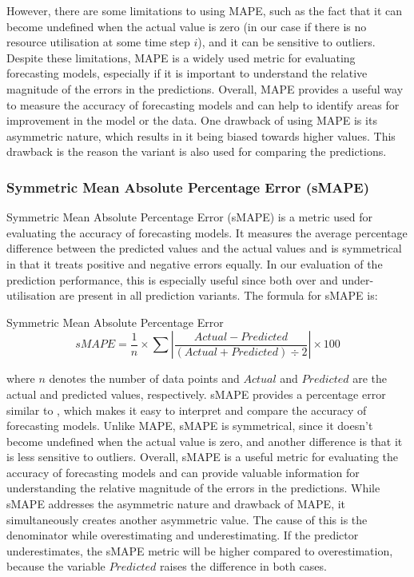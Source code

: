       However, there are some limitations to using MAPE, such as the fact that it can become undefined when the actual value is zero (in our case if there is no resource utilisation at some time step $i$), and it can be sensitive to outliers.
      Despite these limitations, MAPE is a widely used metric for evaluating forecasting models, especially if it is important to understand the relative magnitude of the errors in the predictions. 
      Overall, MAPE provides a useful way to measure the accuracy of forecasting models and can help to identify areas for improvement in the model or the data.
      One drawback of using MAPE is its asymmetric nature, which results in it being biased towards higher values.
      This drawback is the reason the variant  is also used for comparing the predictions.


    \subsubsection{Symmetric Mean Absolute Percentage Error (sMAPE)}
    \label{sec:smape-metrics-evaluation}
    
      Symmetric Mean Absolute Percentage Error (sMAPE) \cite{kreinovichHowEstimateForecasting2014} is a metric used for evaluating the accuracy of forecasting models. It measures the average percentage difference between the predicted values and the actual values and is symmetrical in that it treats positive and negative errors equally.
      In our evaluation of the prediction performance, this is especially useful since both over and under-utilisation are present in all prediction variants.
      The formula for sMAPE is:

      \begin{pabox}{Symmetric Mean Absolute Percentage Error}
        $$sMAPE = \frac{1}{n} \times \sum \left|\frac{Actual - Predicted}{\left(Actual + Predicted\right) \div 2}\right| \times 100$$
      \end{pabox}
      where $n$ denotes the number of data points and $Actual$ and $Predicted$ are the actual and predicted values, respectively.
      sMAPE provides a percentage error similar to , which makes it easy to interpret and compare the accuracy of forecasting models. Unlike MAPE, sMAPE is symmetrical, since it doesn't become undefined when the actual value is zero, and another difference is that it is less sensitive to outliers.
      Overall, sMAPE is a useful metric for evaluating the accuracy of forecasting models and can provide valuable information for understanding the relative magnitude of the errors in the predictions.
      While sMAPE addresses the asymmetric nature and drawback of MAPE, it simultaneously creates another asymmetric value.
      The cause of this is the denominator while overestimating and underestimating.
      If the predictor underestimates, the sMAPE metric will be higher compared to overestimation, because the variable $Predicted$ raises the difference in both cases.
      
